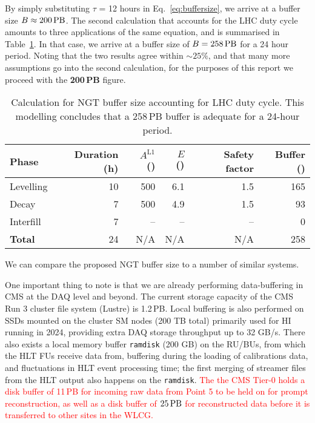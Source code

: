 By simply substituting $\tau$ = 12 hours in Eq.~\ref{eq:buffersize}, we arrive at a buffer size $B \approx 200\,\text{PB}$.
The second calculation that accounts for the LHC duty cycle amounts to three applications of the same equation,
and is summarised in Table~\ref{tab:bufferWithDutyCycle}. In that case, we arrive at a buffer size of $B = 258\,\text{PB}$ for a 24 hour period.
Noting that the two results agree within $\sim25\%$, and that many more assumptions go into the second calculation, for the purposes of this report we proceed with the \textbf{200\,PB} figure.
\begin{table}[htbp]
   \centering
   \begin{tabular}{@{} lrrrrr @{}} %
      \toprule
		Phase & Duration (h) & $A^{\text{L1}}$ (\kHz) & $E$ (\MB) & Safety factor & Buffer (\PB)\\
      	\midrule
		Levelling & 10 & 500 & 6.1 & 1.5 & 165 \\
		Decay     &  7 & 500 & 4.9 & 1.5 &  93 \\
		Interfill &  7 &  -- &  -- &  -- &   0 \\
		\midrule
\textbf{Total}    & 24 & N/A & N/A & N/A & 258\\ 
      \bottomrule
   \end{tabular}
   \caption{Calculation for NGT buffer size accounting for LHC duty cycle. 
   This modelling concludes that a 258\,PB buffer is adequate for a 24-hour period.}
   \label{tab:bufferWithDutyCycle}
\end{table}

We can compare the proposed NGT buffer size to a number of similar systems. 

One important thing to note is that we are already performing data-buffering in CMS at the DAQ level and beyond. The current storage capacity of the CMS Run 3 cluster file system (Lustre) is 1.2\,PB. Local buffering is also performed on SSDs mounted on the cluster SM nodes (200 TB total) primarily used for HI running in 2024, providing extra DAQ storage throughput up to 32 GB/s. There also exists a local memory buffer \texttt{ramdisk} (200 GB) on the RU/BUs, from which the HLT FUs receive data from, buffering during the loading of calibrations data, and fluctuations in HLT event processing time; the first merging of streamer files from the HLT output also happens on the \texttt{ramdisk}. \textcolor{red}{The the CMS Tier-0 holds a disk buffer of 11\,PB for incoming raw data from Point 5 to be held on for prompt reconstruction,
as well as a disk buffer of $25\,\text{PB}$ for reconstructed data before it is transferred to other sites in the WLCG.}

